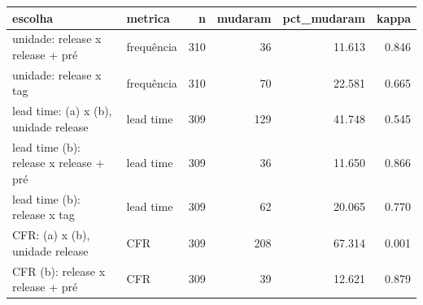 \begin{tabular}{llrrrr}
\toprule
escolha & metrica & n & mudaram & pct_mudaram & kappa \\
\midrule
unidade: release x release + pré & frequência & 310 & 36 & 11.613 & 0.846 \\
unidade: release x tag & frequência & 310 & 70 & 22.581 & 0.665 \\
lead time: (a) x (b), unidade release & lead time & 309 & 129 & 41.748 & 0.545 \\
lead time (b): release x release + pré & lead time & 309 & 36 & 11.650 & 0.866 \\
lead time (b): release x tag & lead time & 309 & 62 & 20.065 & 0.770 \\
CFR: (a) x (b), unidade release & CFR & 309 & 208 & 67.314 & 0.001 \\
CFR (b): release x release + pré & CFR & 309 & 39 & 12.621 & 0.879 \\
\bottomrule
\end{tabular}
